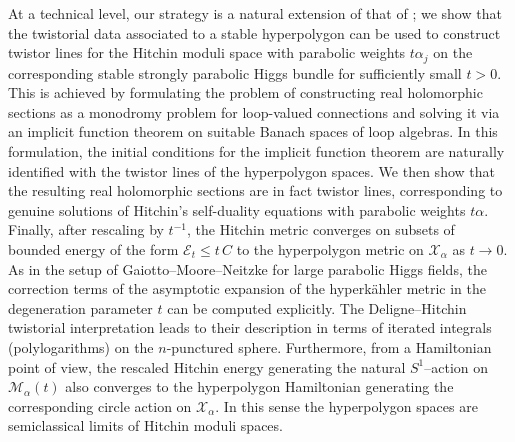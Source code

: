 \documentclass[12pt,a4paper]{amsart}
\theoremstyle{definition}
\theoremstyle{remark}
\newcommand{\Mcal}{\mathcal M}
\begin{document}
At a technical level, our strategy is a natural extension of that 
of \cite{HellerHellerTraizet2025}; we show 
that the twistorial data 
associated to a stable hyperpolygon can be used to construct 
twistor lines for the
Hitchin moduli space with parabolic weights $t\alpha_j$ on the 
corresponding stable strongly parabolic Higgs bundle for sufficiently small $t>0$.
This is achieved by formulating the problem of constructing real holomorphic sections as a monodromy problem for loop-valued connections and solving it via an implicit function theorem on suitable Banach spaces of loop algebras. In this formulation, the initial conditions for the implicit function theorem are naturally identified with the twistor lines of the hyperpolygon spaces.
We then show that the resulting real holomorphic sections are in fact twistor
lines, corresponding to genuine solutions of Hitchin's self-duality equations with
parabolic weights $t\alpha$. Finally, after rescaling  by $t^{-1}$, 
the Hitchin metric converges on subsets of bounded energy of the form $\mathcal E_t \le t\,C$
 to the hyperpolygon metric on $\mathcal X_\alpha$ as $t\to0$. 
As in  the setup of Gaiotto--Moore--Neitzke \cite{GMN} for large parabolic Higgs fields, the correction terms of the asymptotic expansion of the 
hyperk\"ahler metric in the degeneration parameter $t$ can be computed explicitly. 
The Deligne--Hitchin twistorial interpretation leads to their description in terms of 
iterated integrals  (polylogarithms) on the $n$-punctured sphere.
Furthermore,
from a Hamiltonian point of view, 
the rescaled Hitchin energy generating the natural $S^1$--action on $\Mcal_\alpha(t)$ also converges 
to the hyperpolygon Hamiltonian generating the corresponding circle action on $\mathcal X_\alpha$. 
In this sense  the hyperpolygon spaces are semiclassical limits 
of Hitchin moduli spaces.
\end{document}

